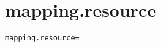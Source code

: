 \section{mapping.resource}
\label{configuration:MappingResource}
\ClearAPI
\TODO
{}
\begin{lstlisting}[style=Props,caption={Usage example for \textit{mapping.resource}}]
mapping.resource=
\end{lstlisting}